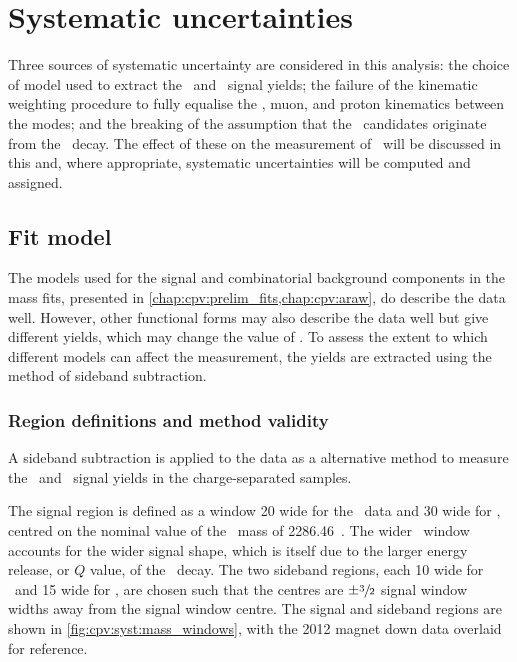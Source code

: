 \chapter{Systematic uncertainties}
\label{chap:cpv:syst}

Three sources of systematic uncertainty are considered in this analysis: the 
choice of model used to extract the \PLambdac\ and \APLambdac\ signal yields; 
the failure of the kinematic weighting procedure to fully equalise the 
\PLambdab, muon, and proton kinematics between the modes; and the breaking of 
the assumption that the \PLambdac\ candidates originate from the \LbToLcmuX\ 
decay.
The effect of these on the measurement of \dACP\ will be discussed in this 
\lcnamecref{chap:cpv:syst} and, where appropriate, systematic uncertainties 
will be computed and assigned.

\section{Fit model}
\label{chap:cpv:syst:fit}

The models used for the signal and combinatorial background components in the 
mass fits, presented in \cref{chap:cpv:prelim_fits,chap:cpv:araw}, do describe 
the data well.
However, other functional forms may also describe the data well but give 
different yields, which may change the value of \dACP\@.
To assess the extent to which different models can affect the measurement, the 
yields are extracted using the method of sideband subtraction.

\subsection{Region definitions and method validity}
\label{chap:cpv:syst:fit:defs}

A sideband subtraction is applied to the data as a alternative method to 
measure the \pKK\ and \ppipi\ signal yields in the charge-separated samples.

The signal region is defined as a window \SI{20}{\MeVcc} wide for the \pKK\ 
data and \SI{30}{\MeVcc} wide for \ppipi, centred on the nominal value of the 
\PLambdac\ mass of \SI{2286.46}{\MeVcc}~\cite{PDG2014}.
The wider \ppipi\ window accounts for the wider signal shape, which is itself 
due to the larger energy release, or $Q$ value, of the \ppipi\ decay.
The two sideband regions, each \SI{10}{\MeVcc} wide for \pKK\ and 
\SI{15}{\MeVcc} wide for \ppipi, are chosen such that the centres are 
$\pm\sfrac{3}{2}$ signal window widths away from the signal window centre.
The signal and sideband regions are shown in \cref{fig:cpv:syst:mass_windows}, 
with the 2012 magnet down data overlaid for reference.

